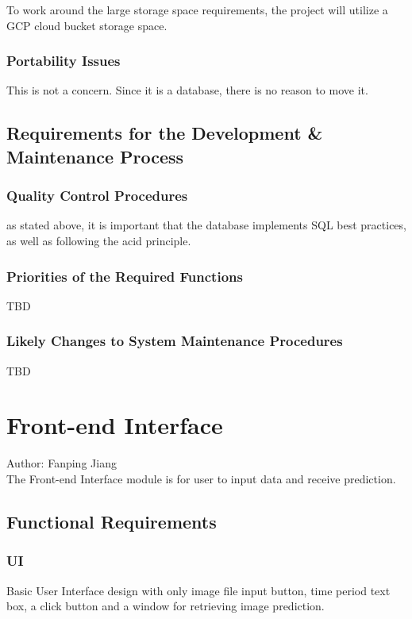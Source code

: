 \documentclass[12pt]{article}
\begin{document}
To work around the large storage space requirements, the project will utilize a GCP cloud bucket
storage space.

\subsubsection {Portability Issues}

This is not a concern. Since it is a database, there is no reason to move it.

\subsection{Requirements for the Development \& Maintenance Process}

\subsubsection {Quality Control Procedures}

as stated above, it is important that the database implements SQL best practices, as well as
following the acid principle.

\subsubsection {Priorities of the Required Functions}

TBD

\subsubsection {Likely Changes to System Maintenance Procedures}

TBD

\section{Front-end Interface}
Author: Fanping Jiang\\

\noindent The Front-end Interface module is for user to input data and receive prediction.

\subsection{Functional Requirements}
\subsubsection{UI}
Basic User Interface design with only image file input button, time period text box, a click button and a window for retrieving image prediction.
\end{document}
